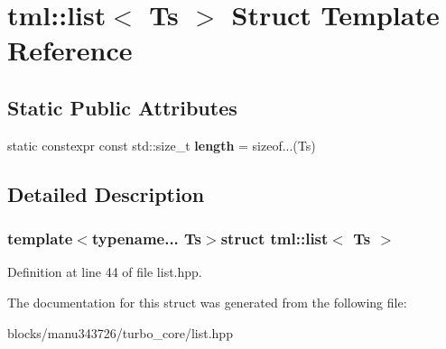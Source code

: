 \hypertarget{structtml_1_1list}{\section{tml\+:\+:list$<$ Ts $>$ Struct Template Reference}
\label{structtml_1_1list}
}
\subsection*{Static Public Attributes}
\begin{DoxyCompactItemize}
\item 
\hypertarget{structtml_1_1list_a8124eaee39e87ee436d39b762e4a256e}{static constexpr const std\+::size\+\_\+t {\bfseries length} = sizeof...(Ts)}\label{structtml_1_1list_a8124eaee39e87ee436d39b762e4a256e}

\end{DoxyCompactItemize}


\subsection{Detailed Description}
\subsubsection*{template$<$typename... Ts$>$struct tml\+::list$<$ Ts $>$}



Definition at line 44 of file list.\+hpp.



The documentation for this struct was generated from the following file\+:\begin{DoxyCompactItemize}
\item 
blocks/manu343726/turbo\+\_\+core/list.\+hpp\end{DoxyCompactItemize}

